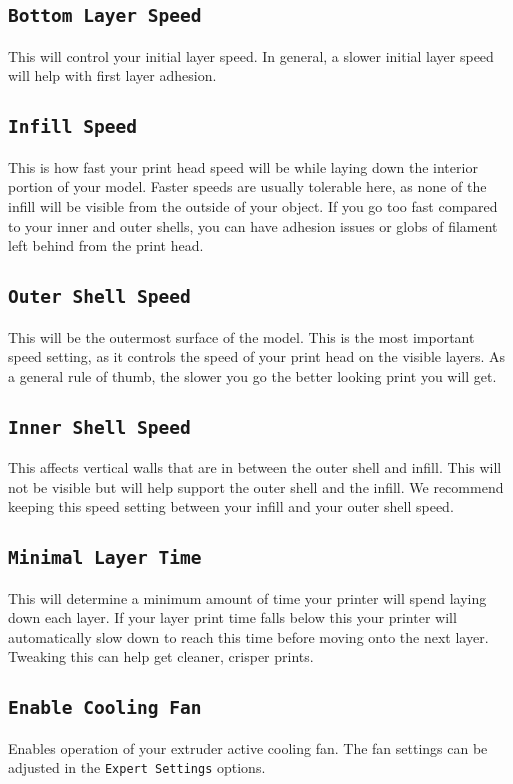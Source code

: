 \subsection{\texttt{Bottom Layer Speed}}
This will control your initial layer speed. In general, a slower initial layer speed will help with first layer adhesion. 

\subsection{\texttt{Infill Speed}}
This is how fast your print head speed will be while laying down the interior portion of your model. Faster speeds are usually tolerable here, as none of the infill will be visible from the outside of your object. If you go too fast compared to your inner and outer shells, you can have adhesion issues or globs of filament left behind from the print head.

\subsection{\texttt{Outer Shell Speed}}
This will be the outermost surface of the model. This is the most important speed setting, as it controls the speed of your print head on the visible layers. As a general rule of thumb, the slower you go the better looking print you will get. 

\subsection{\texttt{Inner Shell Speed}}
This affects vertical walls that are in between the outer shell and infill. This will not be visible but will help support the outer shell and the infill. We recommend keeping this speed setting between your infill and your outer shell speed.

\subsection{\texttt{Minimal Layer Time}}
This will determine a minimum amount of time your printer will spend laying down each layer. If your layer print time falls below this your printer will automatically slow down to reach this time before moving onto the next layer. Tweaking this can help get cleaner, crisper prints.

\subsection{\texttt{Enable Cooling Fan}}
Enables operation of your extruder active cooling fan. The fan settings can be adjusted in the \texttt{Expert Settings} options.

